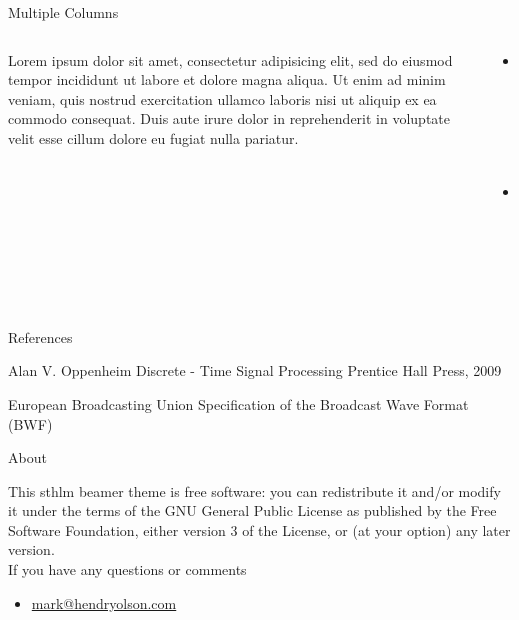 \documentclass[compress,PxFont]{beamer}
\begin{document}

\begin{frame}{Multiple Columns}
\begin{columns}
\begin{column}{.48\linewidth}
		Lorem ipsum dolor sit amet, consectetur adipisicing elit, sed do eiusmod
		tempor incididunt ut labore et dolore magna aliqua. Ut enim ad minim veniam,
		quis nostrud exercitation ullamco laboris nisi ut aliquip ex ea commodo
		consequat. Duis aute irure dolor in reprehenderit in voluptate velit esse
		cillum dolore eu fugiat nulla pariatur. 
\end{column}
\begin{column}{.48\linewidth}
		\begin{itemize}
        	\item Point 1
        	\item Point 2
		\end{itemize}
	\end{column}
	\end{columns}
\end{frame}

\begin{frame}{References}
	\begin{thebibliography}{10}
    
	\beamertemplatebookbibitems
	Alan V. Oppenheim
	\newblock Discrete - Time Signal Processing
	\newblock Prentice Hall Press, 2009

	\beamertemplatearticlebibitems
	European Broadcasting Union
	\newblock Specification of the Broadcast Wave Format (BWF)
  \end{thebibliography}
\end{frame}

%
%

\begin{frame}{About}
	
	This sthlm beamer theme is free software: you can redistribute it and/or modify
	it under the terms of the GNU General Public License as published by
	the Free Software Foundation, either version 3 of the License, or
	(at your option) any later version.\\

	If you have any questions or comments
	\begin{itemize}
		\item \url{mark@hendryolson.com}
	\end{itemize}
\end{frame}
\end{document}
